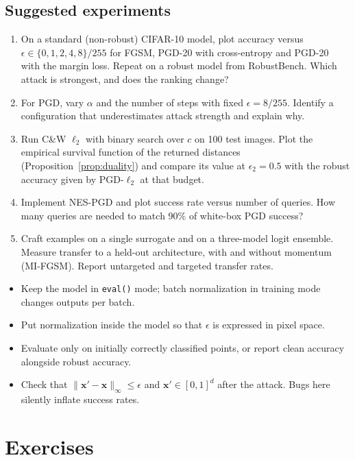 \documentclass[10pt,a4paper]{extarticle}
\theoremstyle{definition}
\newcommand{\x}{\mathbf{x}}
\newcommand{\xadv}{\mathbf{x}'}
\begin{document}
\subsection{Suggested experiments}

\begin{enumerate}[label=\textbf{\arabic*.}]
  \item On a standard (non-robust) CIFAR-10 model, plot accuracy versus \(\epsilon\in\{0,1,2,4,8\}/255\) for FGSM, PGD-20 with cross-entropy and PGD-20 with the margin loss. Repeat on a robust model from RobustBench. Which attack is strongest, and does the ranking change?
  \item For PGD, vary \(\alpha\) and the number of steps with fixed \(\epsilon=8/255\). Identify a configuration that underestimates attack strength and explain why.
  \item Run C\&W \(\ell_2\) with binary search over \(c\) on 100 test images. Plot the empirical survival function of the returned distances (Proposition~\ref{prop:duality}) and compare its value at \(\epsilon_2=0.5\) with the robust accuracy given by PGD-\(\ell_2\) at that budget.
  \item Implement NES-PGD and plot success rate versus number of queries. How many queries are needed to match 90\% of white-box PGD success?
  \item Craft examples on a single surrogate and on a three-model logit ensemble. Measure transfer to a held-out architecture, with and without momentum (MI-FGSM). Report untargeted and targeted transfer rates.
\end{enumerate}

\begin{warnbox}
\begin{itemize}
  \item Keep the model in \texttt{eval()} mode; batch normalization in training mode changes outputs per batch.
  \item Put normalization inside the model so that \(\epsilon\) is expressed in pixel space.
  \item Evaluate only on initially correctly classified points, or report clean accuracy alongside robust accuracy.
  \item Check that \(\|\xadv-\x\|_\infty\le\epsilon\) and \(\xadv\in[0,1]^d\) after the attack. Bugs here silently inflate success rates.
\end{itemize}
\end{warnbox}

\section*{Exercises}
\end{document}
